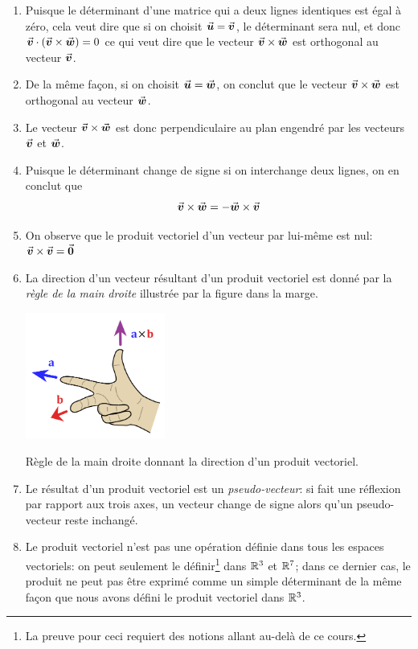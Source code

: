 \begin{enumerate}
\item Puisque le déterminant d'une matrice qui a deux lignes identiques est égal à zéro, cela veut
dire que si on choisit $\vec{\boldsymbol{u}} = \vec{\boldsymbol{v}}$, le déterminant sera nul, et donc 
$\vec{\boldsymbol{v}} \cdot (\vec{\boldsymbol{v}}\times\vec{\boldsymbol{w}}) = 0$
ce qui veut dire que le vecteur $\vec{\boldsymbol{v}}\times\vec{\boldsymbol{w}}$ est orthogonal au vecteur $\vec{\boldsymbol{v}}$.
\item De la même façon, si on choisit $\vec{\boldsymbol{u}} = \vec{\boldsymbol{w}}$, on conclut que 
 le vecteur $\vec{\boldsymbol{v}}\times\vec{\boldsymbol{w}}$ est orthogonal au vecteur $\vec{\boldsymbol{w}}$.
 \item Le vecteur  $\vec{\boldsymbol{v}}\times\vec{\boldsymbol{w}}$ est donc perpendiculaire au plan engendré par les
 vecteurs  $\vec{\boldsymbol{v}}$ et  $\vec{\boldsymbol{w}}$.

 \item Puisque le déterminant change de signe si on interchange deux lignes, on en conclut que
 \[
 \vec{\boldsymbol{v}}\times\vec{\boldsymbol{w}} = - \vec{\boldsymbol{w}}\times\vec{\boldsymbol{v}}
 \]
 \item On observe que le produit vectoriel d'un vecteur par lui-même est nul: $\vec{\boldsymbol{v}}\times\vec{\boldsymbol{v}}=\vec{\boldsymbol{0}}$
 \item La direction d'un vecteur résultant d'un produit vectoriel est donné par la \textit{règle de la main droite} illustrée par
 la figure dans la marge.
 \begin{marginfigure}
 \includegraphics[width=1.8in]{images/main-droite.png}
 \caption{Règle de la main droite donnant la direction d'un produit vectoriel.}\label{image:main-droite}
 \end{marginfigure}
 \item Le résultat d'un produit vectoriel est un \textit{pseudo-vecteur}: si fait une réflexion par rapport aux
 trois axes, un vecteur change de signe alors qu'un pseudo-vecteur reste inchangé.
 \item Le produit vectoriel n'est pas une opération définie dans tous les espaces vectoriels: on peut
 seulement le définir\footnote{La preuve pour ceci requiert des notions
  allant au-delà de ce cours.}
   dans $\mathbb{R}^3$ et $\mathbb{R}^7$; 
   dans ce dernier cas, le produit ne peut pas être exprimé comme un simple déterminant
 de la même façon que nous avons défini le produit vectoriel dans $\mathbb{R}^3$.
 \end{enumerate}
 
